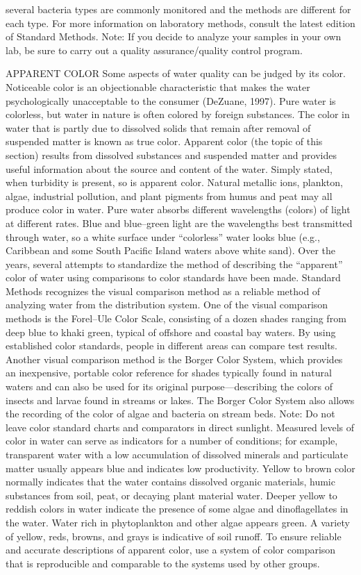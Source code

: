 \documentclass{article}
\begin{document}
several bacteria types are commonly monitored and the methods are
different for each type. For more information on laboratory methods,
consult the latest edition of Standard Methods. Note: If you decide to
analyze your samples in your own lab, be sure to carry out a quality
assurance/quality control program.

APPARENT COLOR Some aspects of water quality can be judged by its color.
Noticeable color is an objectionable characteristic that makes the water
psychologically unacceptable to the consumer (DeZuane, 1997). Pure water
is colorless, but water in nature is often colored by foreign
substances. The color in water that is partly due to dissolved solids
that remain after removal of suspended matter is known as true color.
Apparent color (the topic of this section) results from dissolved
substances and suspended matter and provides useful information about
the source and content of the water. Simply stated, when turbidity is
present, so is apparent color. Natural metallic ions, plankton, algae,
industrial pollution, and plant pigments from humus and peat may all
produce color in water. Pure water absorbs different wavelengths
(colors) of light at different rates. Blue and blue--green light are the
wavelengths best transmitted through water, so a white surface under
``colorless'' water looks blue (e.g., Caribbean and some South Pacific
Island waters above white sand). Over the years, several attempts to
standardize the method of describing the ``apparent'' color of water
using comparisons to color standards have been made. Standard Methods
recognizes the visual comparison method as a reliable method of
analyzing water from the distribution system. One of the visual
comparison methods is the Forel--Ule Color Scale, consisting of a dozen
shades ranging from deep blue to khaki green, typical of offshore and
coastal bay waters. By using established color standards, people in
different areas can compare test results. Another visual comparison
method is the Borger Color System, which provides an inexpensive,
portable color reference for shades typically found in natural waters
and can also be used for its original purpose---describing the colors of
insects and larvae found in streams or lakes. The Borger Color System
also allows the recording of the color of algae and bacteria on stream
beds. Note: Do not leave color standard charts and comparators in direct
sunlight. Measured levels of color in water can serve as indicators for
a number of conditions; for example, transparent water with a low
accumulation of dissolved minerals and particulate matter usually
appears blue and indicates low productivity. Yellow to brown color
normally indicates that the water contains dissolved organic materials,
humic substances from soil, peat, or decaying plant material water.
Deeper yellow to reddish colors in water indicate the presence of some
algae and dinoflagellates in the water. Water rich in phytoplankton and
other algae appears green. A variety of yellow, reds, browns, and grays
is indicative of soil runoff. To ensure reliable and accurate
descriptions of apparent color, use a system of color comparison that is
reproducible and comparable to the systems used by other groups.
\end{document}
